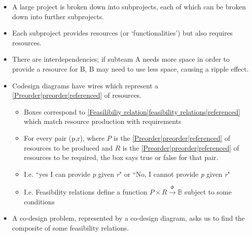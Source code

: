 \begin{itemize}
    \item A large project is broken down into subprojects, each of which can be broken down into further subprojects.
    \item Each subproject provides resources (or `functionalities') but also requires resources.
    \item There are interdependencies; if subteam A needs more space in order to provide a resource for B, B may need to use less space, causing a ripple effect.
    \item Codesign diagrams have wires which represent a \ref{Preorder|preorder|referenced} of resources.
          \begin{itemize}
            \item Boxes correspond to \ref{Feasilibiliy relation|feasibility relations|referenced} which match resource production with requirements
            \item For every pair (p,r), where $P$ is the \ref{Preorder|preorder|referenced} of resources to be produced and $R$ is the \ref{Preorder|preorder|referenced} of resources to be required, the box says true or false for that pair.
            \item I.e. ``yes I can provide \emph{p} given \emph{r}" or ``No, I cannot provide \emph{p} given \emph{r}"
            \item I.e. Feasibility relations define a function $P \times  R \xrightarrow{\Phi}\mathbb{B}$ subject to some conditions
          \end{itemize}
    \item A co-design problem, represented by a co-design diagram, asks us to find the composite of some feasibility relations.
          \begin{center}


\end{center}
\end{itemize}

